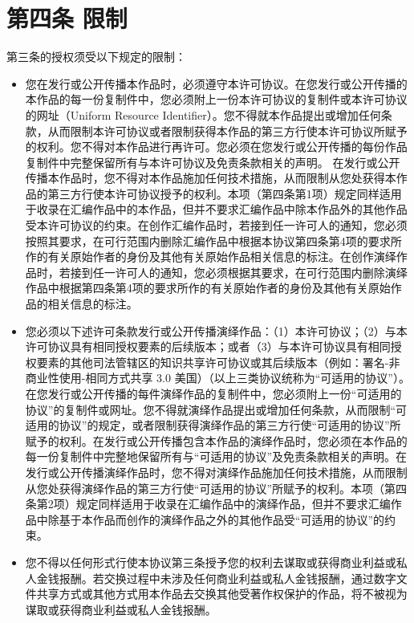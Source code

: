 \documentclass{book}
\begin{document}
\section{第四条 限制}
第三条的授权须受以下规定的限制： 
\begin{itemize}
	\item 您在发行或公开传播本作品时，必须遵守本许可协议。在您发行或公开传播的本作品的每一份复制件中，您必须附上一份本许可协议的复制件或本许可协议的网址（Uniform Resource Identifier）。您不得就本作品提出或增加任何条款，从而限制本许可协议或者限制获得本作品的第三方行使本许可协议所赋予的权利。您不得对本作品进行再许可。您必须在您发行或公开传播的每份作品复制件中完整保留所有与本许可协议及免责条款相关的声明。 在发行或公开传播本作品时，您不得对本作品施加任何技术措施，从而限制从您处获得本作品的第三方行使本许可协议授予的权利。本项（第四条第1项）规定同样适用于收录在汇编作品中的本作品，但并不要求汇编作品中除本作品外的其他作品受本许可协议的约束。在创作汇编作品时，若接到任一许可人的通知，您必须按照其要求，在可行范围内删除汇编作品中根据本协议第四条第4项的要求所作的有关原始作者的身份及其他有关原始作品相关信息的标注。在创作演绎作品时，若接到任一许可人的通知，您必须根据其要求，在可行范围内删除演绎作品中根据第四条第4项的要求所作的有关原始作者的身份及其他有关原始作品的相关信息的标注。
	\item 您必须以下述许可条款发行或公开传播演绎作品：（1）本许可协议；（2）与本许可协议具有相同授权要素的后续版本；或者（3）与本许可协议具有相同授权要素的其他司法管辖区的知识共享许可协议或其后续版本（例如：署名-非商业性使用-相同方式共享 3.0 美国）（以上三类协议统称为“可适用的协议”）。在您发行或公开传播的每件演绎作品的复制件中，您必须附上一份“可适用的协议”的复制件或网址。您不得就演绎作品提出或增加任何条款，从而限制“可适用的协议”的规定，或者限制获得演绎作品的第三方行使“可适用的协议”所赋予的权利。在发行或公开传播包含本作品的演绎作品时，您必须在本作品的每一份复制件中完整地保留所有与“可适用的协议”及免责条款相关的声明。在发行或公开传播演绎作品时，您不得对演绎作品施加任何技术措施，从而限制从您处获得演绎作品的第三方行使“可适用的协议”所赋予的权利。本项（第四条第2项）规定同样适用于收录在汇编作品中的演绎作品，但并不要求汇编作品中除基于本作品而创作的演绎作品之外的其他作品受“可适用的协议”的约束。 
	\item 您不得以任何形式行使本协议第三条授予您的权利去谋取或获得商业利益或私人金钱报酬。若交换过程中未涉及任何商业利益或私人金钱报酬，通过数字文件共享方式或其他方式用本作品去交换其他受著作权保护的作品，将不被视为谋取或获得商业利益或私人金钱报酬。

\end{itemize}
\end{document}
